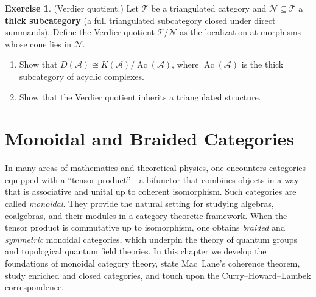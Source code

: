 \documentclass[a4paper,12pt]{book}
\theoremstyle{definition}
\newtheorem{exercise}[definition]{Exercise}
\theoremstyle{plain}
\theoremstyle{remark}
\begin{document}
\begin{exercise}\label{exo:verdier-quotient}
(Verdier quotient.) Let $\mathcal{T}$ be a triangulated category and
$\mathcal{N} \subseteq \mathcal{T}$ a \textbf{thick subcategory} (a full triangulated
subcategory closed under direct summands). Define the Verdier quotient $\mathcal{T}/\mathcal{N}$
as the localization at morphisms whose cone lies in $\mathcal{N}$.
\begin{enumerate}
    \item Show that $D(\mathcal{A}) \cong K(\mathcal{A}) / \operatorname{Ac}(\mathcal{A})$,
    where $\operatorname{Ac}(\mathcal{A})$ is the thick subcategory of acyclic complexes.
    \item Show that the Verdier quotient inherits a triangulated structure.
\end{enumerate}
\end{exercise}


\chapter{Monoidal and Braided Categories}\label{ch:monoidal}
\minitoc

\vspace{1em}

In many areas of mathematics and theoretical physics, one encounters
categories equipped with a ``tensor product''---a bifunctor that combines
objects in a way that is associative and unital up to coherent isomorphism.
Such categories are called \emph{monoidal}.  They provide the natural
setting for studying algebras, coalgebras, and their modules in a
category-theoretic framework.  When the tensor product is commutative
up to isomorphism, one obtains \emph{braided} and \emph{symmetric} monoidal
categories, which underpin the theory of quantum groups and topological
quantum field theories.  In this chapter we develop the foundations of
monoidal category theory, state Mac~Lane's coherence theorem, study
enriched and closed categories, and touch upon the Curry--Howard--Lambek
correspondence.
\end{document}
